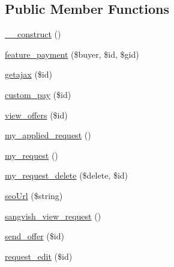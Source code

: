 \subsection*{Public Member Functions}
\begin{DoxyCompactItemize}
\item 
\mbox{\hyperlink{class_responsive_1_1_http_1_1_controllers_1_1_request_controller_a095c5d389db211932136b53f25f39685}{\+\_\+\+\_\+construct}} ()
\item 
\mbox{\hyperlink{class_responsive_1_1_http_1_1_controllers_1_1_request_controller_afa0fed070a2ac7f767e281a81d74f9ce}{feature\+\_\+payment}} (\$buyer, \$id, \$gid)
\item 
\mbox{\hyperlink{class_responsive_1_1_http_1_1_controllers_1_1_request_controller_a4835696e5f4f4682a41359c1c5192a28}{getajax}} (\$id)
\item 
\mbox{\hyperlink{class_responsive_1_1_http_1_1_controllers_1_1_request_controller_ab67cef589a2521613f530603f69a6cc0}{custom\+\_\+pay}} (\$id)
\item 
\mbox{\hyperlink{class_responsive_1_1_http_1_1_controllers_1_1_request_controller_aef7a6634a13655f15077aece970d9f1c}{view\+\_\+offers}} (\$id)
\item 
\mbox{\hyperlink{class_responsive_1_1_http_1_1_controllers_1_1_request_controller_a601d74e7d99aa15aee1f7ef56d640159}{my\+\_\+applied\+\_\+request}} ()
\item 
\mbox{\hyperlink{class_responsive_1_1_http_1_1_controllers_1_1_request_controller_a93d834c295b873076ed53031e6b681ec}{my\+\_\+request}} ()
\item 
\mbox{\hyperlink{class_responsive_1_1_http_1_1_controllers_1_1_request_controller_a2e2512ae637b42ad3d59325c726d7751}{my\+\_\+request\+\_\+delete}} (\$delete, \$id)
\item 
\mbox{\hyperlink{class_responsive_1_1_http_1_1_controllers_1_1_request_controller_a99b5491ac6f1b84c2ea18a859cf2d44b}{seo\+Url}} (\$string)
\item 
\mbox{\hyperlink{class_responsive_1_1_http_1_1_controllers_1_1_request_controller_a34dc9bf7a254d8cfdc103f150de995c7}{sangvish\+\_\+view\+\_\+request}} ()
\item 
\mbox{\hyperlink{class_responsive_1_1_http_1_1_controllers_1_1_request_controller_a7c46e935fa9d506b1f29dbd92b587044}{send\+\_\+offer}} (\$id)
\item 
\mbox{\hyperlink{class_responsive_1_1_http_1_1_controllers_1_1_request_controller_a181cfc7902be3de4d254b59b6715efe1}{request\+\_\+edit}} (\$id)
\end{DoxyCompactItemize}
